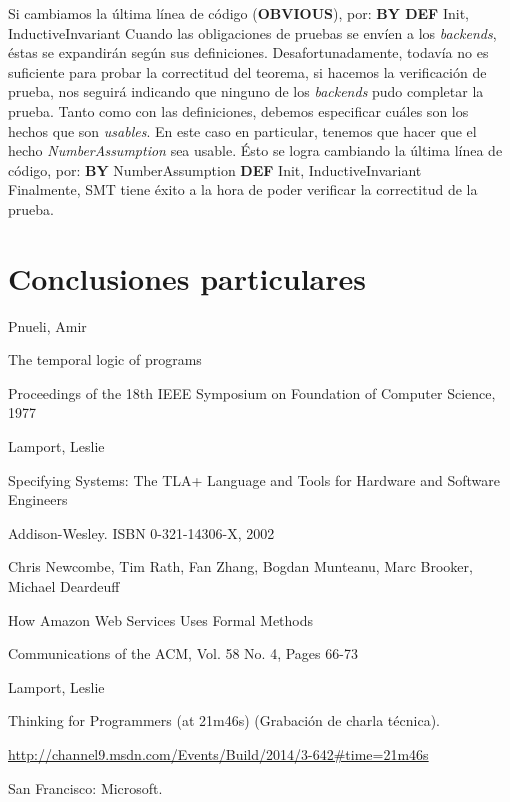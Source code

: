 \documentclass[spanish]{llncs}
\begin{document}
Si cambiamos la última línea de código (\textbf{OBVIOUS}), por:
\subitem \textbf{BY DEF} Init, InductiveInvariant
Cuando las obligaciones de pruebas se envíen a los \textit{backends}, éstas se expandirán según sus definiciones. Desafortunadamente, todavía no es suficiente para probar la correctitud del teorema, si hacemos la verificación de prueba, nos seguirá indicando que ninguno de los \textit{backends} pudo completar la prueba.
Tanto como con las definiciones, debemos especificar cuáles son los hechos que son \textit{usables}. En este caso en particular, tenemos que hacer que el hecho \textit{NumberAssumption} sea usable. Ésto se logra cambiando la última línea de código, por:
\subitem \textbf{BY} NumberAssumption \textbf{DEF} Init, InductiveInvariant
\\

Finalmente, SMT tiene éxito a la hora de poder verificar la correctitud de la prueba.
\section{Conclusiones particulares}



%
%
\begin{thebibliography}{5}
%
Pnueli, Amir

The temporal logic of programs

Proceedings of the 18th IEEE Symposium on Foundation of Computer Science, 1977

Lamport, Leslie

Specifying Systems: The TLA+ Language and Tools for Hardware and Software Engineers

Addison-Wesley. ISBN 0-321-14306-X, 2002

Chris Newcombe, Tim Rath, Fan Zhang, Bogdan Munteanu, Marc Brooker, Michael Deardeuff 

How Amazon Web Services Uses Formal Methods

Communications of the ACM, Vol. 58 No. 4, Pages 66-73

Lamport, Leslie 

Thinking for Programmers (at 21m46s) (Grabación de charla técnica). 

\url{http://channel9.msdn.com/Events/Build/2014/3-642#time=21m46s}

San Francisco: Microsoft.

\end{thebibliography}

\clearpage
\end{document}
